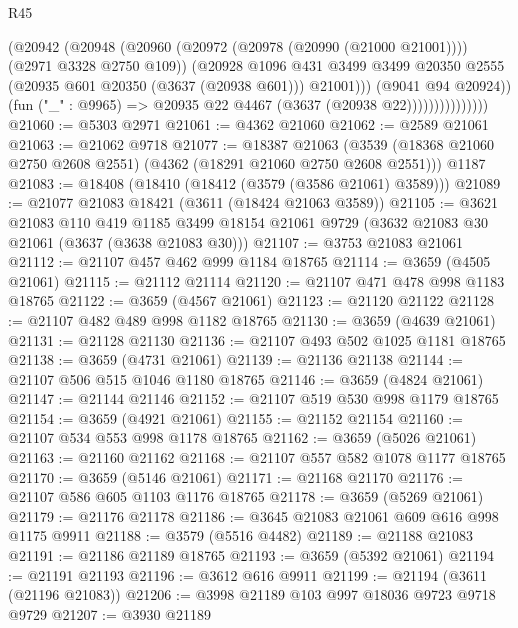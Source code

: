 \begin{lexlean}{R45}
\begin{coremodule}
                              (@20942
                                (@20948
                                  (@20960
                                    (@20972 (@20978 (@20990 (@21000 @21001))))
                                    (@2971 @3328 @2750 @109))
                                  (@20928
                                    @1096
                                    @431
                                    @3499
                                    @3499
                                    @20350
                                    @2555
                                    (@20935 @601 @20350 (@3637 (@20938 @601)))
                                    @21001)))
                              (@9041 @94 @20924))
                            (fun ("_" : @9965) => @20935 @22 @4467 (@3637 (@20938 @22)))))))))))))))
@21060 := @5303 @2971
@21061 := @4362 @21060
@21062 := @2589 @21061
@21063 := @21062 @9718
@21077 := @18387
    @21063
    (@3539 (@18368 @21060 @2750 @2608 @2551) (@4362 (@18291 @21060 @2750 @2608 @2551)))
    @1187
@21083 := @18408 (@18410 (@18412 (@3579 (@3586 @21061) @3589)))
@21089 := @21077 @21083 @18421 (@3611 (@18424 @21063 @3589))
@21105 := @3621
    @21083
    @110
    @419
    @1185
    @3499
    @18154
    @21061
    @9729
    (@3632 @21083 @30 @21061 (@3637 (@3638 @21083 @30)))
@21107 := @3753 @21083 @21061
@21112 := @21107 @457 @462 @999 @1184 @18765
@21114 := @3659 (@4505 @21061)
@21115 := @21112 @21114
@21120 := @21107 @471 @478 @998 @1183 @18765
@21122 := @3659 (@4567 @21061)
@21123 := @21120 @21122
@21128 := @21107 @482 @489 @998 @1182 @18765
@21130 := @3659 (@4639 @21061)
@21131 := @21128 @21130
@21136 := @21107 @493 @502 @1025 @1181 @18765
@21138 := @3659 (@4731 @21061)
@21139 := @21136 @21138
@21144 := @21107 @506 @515 @1046 @1180 @18765
@21146 := @3659 (@4824 @21061)
@21147 := @21144 @21146
@21152 := @21107 @519 @530 @998 @1179 @18765
@21154 := @3659 (@4921 @21061)
@21155 := @21152 @21154
@21160 := @21107 @534 @553 @998 @1178 @18765
@21162 := @3659 (@5026 @21061)
@21163 := @21160 @21162
@21168 := @21107 @557 @582 @1078 @1177 @18765
@21170 := @3659 (@5146 @21061)
@21171 := @21168 @21170
@21176 := @21107 @586 @605 @1103 @1176 @18765
@21178 := @3659 (@5269 @21061)
@21179 := @21176 @21178
@21186 := @3645 @21083 @21061 @609 @616 @998 @1175 @9911
@21188 := @3579 (@5516 @4482)
@21189 := @21188 @21083
@21191 := @21186 @21189 @18765
@21193 := @3659 (@5392 @21061)
@21194 := @21191 @21193
@21196 := @3612 @616 @9911
@21199 := @21194 (@3611 (@21196 @21083))
@21206 := @3998 @21189 @103 @997 @18036 @9723 @9718 @9729
@21207 := @3930 @21189

\end{coremodule}
\end{lexlean}

